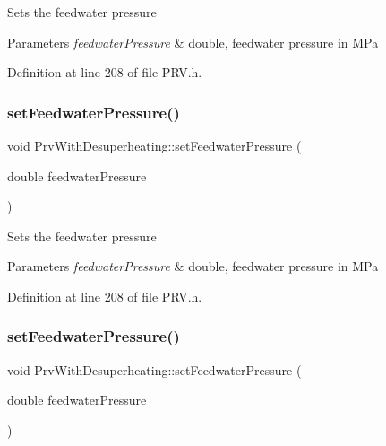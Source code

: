 Sets the feedwater pressure


\begin{DoxyParams}{Parameters}
{\em feedwater\+Pressure} & double, feedwater pressure in M\+Pa \\
\hline
\end{DoxyParams}


Definition at line 208 of file P\+R\+V.\+h.

\mbox{\label{class_prv_with_desuperheating_a8494ebf87e5bd834f621b0c7ca257fbe}} 
\subsubsection{\texorpdfstring{set\+Feedwater\+Pressure()}{setFeedwaterPressure()}\hspace{0.1cm}{\footnotesize\ttfamily [2/3]}}
{\footnotesize\ttfamily void Prv\+With\+Desuperheating\+::set\+Feedwater\+Pressure (\begin{DoxyParamCaption}\item[{double}]{feedwater\+Pressure }\end{DoxyParamCaption})\hspace{0.3cm}{\ttfamily [inline]}}

Sets the feedwater pressure


\begin{DoxyParams}{Parameters}
{\em feedwater\+Pressure} & double, feedwater pressure in M\+Pa \\
\hline
\end{DoxyParams}


Definition at line 208 of file P\+R\+V.\+h.

\mbox{\label{class_prv_with_desuperheating_a8494ebf87e5bd834f621b0c7ca257fbe}} 
\subsubsection{\texorpdfstring{set\+Feedwater\+Pressure()}{setFeedwaterPressure()}\hspace{0.1cm}{\footnotesize\ttfamily [3/3]}}
{\footnotesize\ttfamily void Prv\+With\+Desuperheating\+::set\+Feedwater\+Pressure (\begin{DoxyParamCaption}\item[{double}]{feedwater\+Pressure }\end{DoxyParamCaption})\hspace{0.3cm}{\ttfamily [inline]}}

